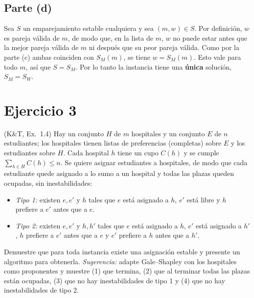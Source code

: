 \subsection*{Parte (d)}
Sea $S$ un emparejamiento estable cualquiera y sea $(m,w)\in S$. Por definición, $w$ es pareja
válida de $m$, de modo que, en la lista de $m$, $w$ no puede estar antes que la mejor pareja
válida de $m$ ni después que su peor pareja válida. Como por la parte (c) ambas coinciden con
$S_M(m)$, se tiene $w=S_M(m)$. Esto vale para todo $m$, así que $S=S_M$. Por lo tanto la
instancia tiene una \textbf{única} solución, $S_M=S_W$.

\section{Ejercicio 3}

\begin{enunciado}
(K\&T, Ex.~1.4) Hay un conjunto $H$ de $m$ hospitales y un conjunto $E$ de $n$ estudiantes;
los hospitales tienen listas de preferencias (completas) sobre $E$ y los estudiantes sobre $H$.
Cada hospital $h$ tiene un cupo $C(h)$ y se cumple $\sum_{h\in H} C(h)\le n$. Se quiere
asignar estudiantes a hospitales, de modo que cada estudiante quede asignado a lo sumo a un
hospital y todas las plazas queden ocupadas, sin inestabilidades:
\begin{itemize}
  \item \emph{Tipo 1:} existen $e,e'$ y $h$ tales que $e$ está asignado a $h$, $e'$ está libre y
        $h$ prefiere a $e'$ antes que a $e$.
  \item \emph{Tipo 2:} existen $e,e'$ y $h,h'$ tales que $e$ está asignado a $h$, $e'$ está
        asignado a $h'$, $h$ prefiere a $e'$ antes que a $e$ y $e'$ prefiere a $h$ antes que a $h'$.
\end{itemize}
Demuestre que para toda instancia existe una asignación estable y presente un algoritmo para
obtenerla. \emph{Sugerencia:} adapte Gale--Shapley con los hospitales como proponentes y muestre
(1) que termina, (2) que al terminar todas las plazas están ocupadas, (3) que no hay
inestabilidades de tipo 1 y (4) que no hay inestabilidades de tipo 2.
\end{enunciado}


